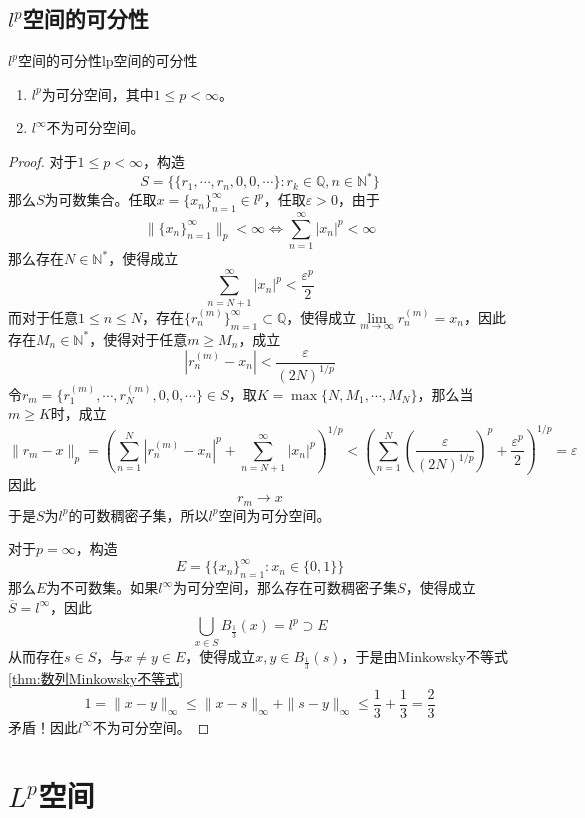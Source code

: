 \documentclass[lang = cn, scheme = chinese, thmcnt = section]{elegantbook}
\newcommand{\N}{\mathbb{N}}            %
\newcommand{\Q}{\mathbb{Q}}            %
\newcommand{\sub}{\subset}             %
\begin{document}
\subsection{$l^p$空间的可分性}

\begin{theorem}{$l^p$空间的可分性}{lp空间的可分性}
	\begin{enumerate}
		\item $l^p$为可分空间，其中$1\le p<\infty$。
		\item $l^\infty$不为可分空间。
	\end{enumerate}
\end{theorem}

\begin{proof}
	对于$1\le p<\infty$，构造
	$$
	S=\{ \{r_1,\cdots,r_n,0,0,\cdots\}:r_k\in\Q,n\in\N^* \}
	$$
	那么$S$为可数集合。任取$x=\{ x_n \}_{n=1}^{\infty}\in l^p$，任取$\varepsilon>0$，由于
	$$
	\|\{ x_n \}_{n=1}^{\infty}\|_p<\infty\iff
	\sum_{n=1}^{\infty}\left|x_n\right|^p<\infty
	$$
	那么存在$N\in\N^*$​，使得成立
	$$
	\sum_{n=N+1}^{\infty}\left|x_n\right|^p<\frac{\varepsilon^p}{2}
	$$
	而对于任意$1\le n\le N$，存在$\{ r^{(m)}_n \}_{m=1}^{\infty}\sub\Q$，使得成立$\lim\limits_{m\to\infty}r_n^{(m)}=x_n$，因此存在$M_n\in\N^*$，使得对于任意$m\ge M_n$，成立
	$$
	|r_n^{(m)}-x_n|<\frac{\varepsilon}{(2N)^{1/p}}
	$$
	令$r_m=\{ r_1^{(m)},\cdots,r_N^{(m)},0,0,\cdots \}\in S$，取$K=\max\{ N,M_1,\cdots,M_{N} \}$，那么当$m\ge K$时，成立
	$$
	\|r_m-x\|_p
	=  \left(\sum_{n=1}^{N}|r_n^{(m)}-x_n|^p+\sum_{n=N+1}^{\infty}|x_n|^p\right)^{1/p}
	< \left(\sum_{n=1}^{N}\left(\frac{\varepsilon}{(2N)^{1/p}}\right)^p+\frac{\varepsilon^p}{2}\right)^{1/p}
	=\varepsilon
	$$
	因此
	$$
	r_m\longrightarrow x
	$$
	于是$S$为$l^p$的可数稠密子集，所以$l^p$空间为可分空间。
	
	对于$p=\infty$，构造
	$$
	E=\{ \{x_n\}_{n=1}^{\infty}:x_n\in\{0,1\} \}
	$$
	那么$E$为不可数集。如果$l^\infty$为可分空间，那么存在可数稠密子集$S$，使得成立$\overline{S}=l^\infty$，因此
	$$
	\bigcup_{x\in S}B_{\frac{1}{3}}(x)=l^p\supset E
	$$
	从而存在$s\in S$，与$x\ne y\in E$，使得成立$x,y\in B_{\frac{1}{3}}(s)$，于是由Minkowsky不等式\ref{thm:数列Minkowsky不等式}
	$$
	1=\|x-y\|_\infty\le 
	\|x-s\|_\infty+\|s-y\|_\infty
	\le \frac{1}{3}+\frac{1}{3}=\frac{2}{3}
	$$
	矛盾！因此$l^\infty$不为可分空间。
\end{proof}

\section{$L^p$空间}
\end{document}
